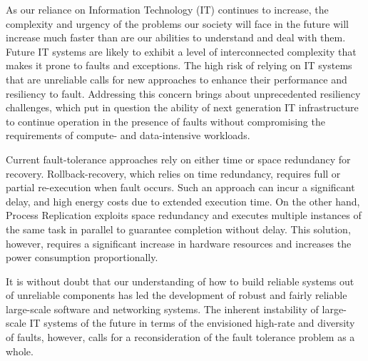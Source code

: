 As our reliance on Information Technology (IT) continues to increase, the complexity and urgency of the problems our society will face in the future will increase much faster than are our abilities to understand and deal with them. Future IT systems are likely to exhibit a level of interconnected complexity that makes it prone to faults and exceptions. The high risk of relying on IT systems that are unreliable calls for new approaches to enhance their performance and resiliency to fault. Addressing this concern brings about unprecedented resiliency challenges, which put in question the ability of next generation IT infrastructure to continue operation in the presence of faults without compromising the requirements of compute- and data-intensive workloads. 

Current fault-tolerance approaches rely on either time or space redundancy for recovery. Rollback-recovery, which
relies on time redundancy, requires full or partial re-execution when fault occurs. 
Such an approach
can incur a significant delay, %
and high energy costs due to extended execution time.
On the other hand, Process Replication exploits space redundancy and executes multiple
instances of the same task in parallel to guarantee completion without delay.  %
This solution,
however, requires a significant increase in hardware resources and increases the power consumption proportionally. 

It is without doubt that our understanding of how to build reliable systems out of unreliable components has led the development of robust and fairly reliable large-scale software and networking systems. The inherent instability of large-scale IT systems of the future in terms of the envisioned high-rate and diversity of faults, however, calls for a reconsideration of the fault tolerance problem as a whole. %


